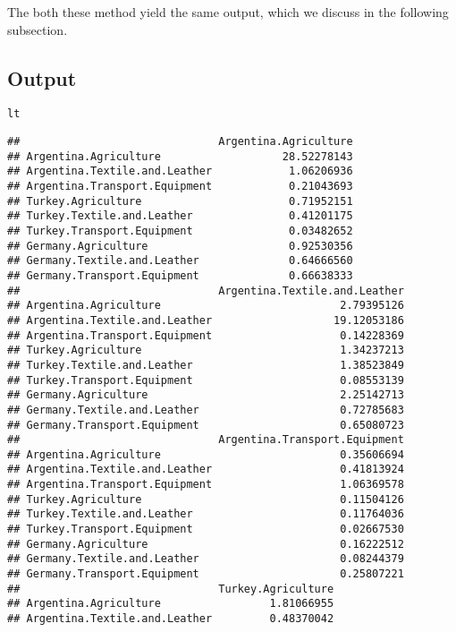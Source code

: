 \documentclass{article}\usepackage[]{graphicx}\usepackage[]{color}
\makeatletter
\newcommand{\hlstd}[1]{\textcolor[rgb]{0.345,0.345,0.345}{#1}}%
\newenvironment{kframe}{%
 \def\at@end@of@kframe{}%
 \ifinner\ifhmode%
  \def\at@end@of@kframe{\end{minipage}}%
  \begin{minipage}{\columnwidth}%
 \fi\fi%
 \def\FrameCommand##1{\hskip\@totalleftmargin \hskip-\fboxsep
 \colorbox{shadecolor}{##1}\hskip-\fboxsep
     \hskip-\linewidth \hskip-\@totalleftmargin \hskip\columnwidth}%
 \MakeFramed {\advance\hsize-\width
   \@totalleftmargin\z@ \linewidth\hsize
   \@setminipage}}%
 {\par\unskip\endMakeFramed%
 \at@end@of@kframe}
\newenvironment{knitrout}{}{} %
\makeatother
\begin{document}
The both these method yield the same output, which we discuss in the following subsection.

\subsection{Output}
\begin{knitrout}
\color{fgcolor}\begin{kframe}
\begin{alltt}
\hlstd{lt}
\end{alltt}
\begin{verbatim}
##                               Argentina.Agriculture
## Argentina.Agriculture                   28.52278143
## Argentina.Textile.and.Leather            1.06206936
## Argentina.Transport.Equipment            0.21043693
## Turkey.Agriculture                       0.71952151
## Turkey.Textile.and.Leather               0.41201175
## Turkey.Transport.Equipment               0.03482652
## Germany.Agriculture                      0.92530356
## Germany.Textile.and.Leather              0.64666560
## Germany.Transport.Equipment              0.66638333
##                               Argentina.Textile.and.Leather
## Argentina.Agriculture                            2.79395126
## Argentina.Textile.and.Leather                   19.12053186
## Argentina.Transport.Equipment                    0.14228369
## Turkey.Agriculture                               1.34237213
## Turkey.Textile.and.Leather                       1.38523849
## Turkey.Transport.Equipment                       0.08553139
## Germany.Agriculture                              2.25142713
## Germany.Textile.and.Leather                      0.72785683
## Germany.Transport.Equipment                      0.65080723
##                               Argentina.Transport.Equipment
## Argentina.Agriculture                            0.35606694
## Argentina.Textile.and.Leather                    0.41813924
## Argentina.Transport.Equipment                    1.06369578
## Turkey.Agriculture                               0.11504126
## Turkey.Textile.and.Leather                       0.11764036
## Turkey.Transport.Equipment                       0.02667530
## Germany.Agriculture                              0.16222512
## Germany.Textile.and.Leather                      0.08244379
## Germany.Transport.Equipment                      0.25807221
##                               Turkey.Agriculture
## Argentina.Agriculture                 1.81066955
## Argentina.Textile.and.Leather         0.48370042

\end{verbatim}
\end{kframe}
\end{knitrout}
\end{document}
